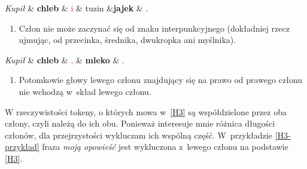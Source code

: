\begin{exe}
\ex  \label{H1-przykład}
\begin{dependency}[baseline=-\the\dimexpr\fontdimen22\textfont2\relax]
\begin{deptext}[column sep=1em, row sep=.1ex]
\emph{Kupił} \& \textbf{chleb} \& \textcolor{red}{i} \& tuzin \&\textbf{jajek} \& .  \\ 
\end{deptext}
\end{dependency}
\end{exe}

\begin{enumerate}
\item[\namedlabel{H2}{(H2)}]
Człon nie może zaczynać się od znaku interpunkcyjnego (dokładniej rzecz ujmując, od przecinka, średnika, dwukropka ani myślnika).
\end{enumerate}

\begin{exe}
\ex  \label{H2-przykład}
\begin{dependency}[baseline=-\the\dimexpr\fontdimen22\textfont2\relax]
\begin{deptext}[column sep=1em]
\emph{Kupił} \& \textbf{chleb} \& \textcolor{red}{,} \& \textbf{mleko} \& .  \\ 
\end{deptext}
\end{dependency}
\end{exe}

\begin{enumerate}
\item[\namedlabel{H3}{(H3)}]
Potomkowie głowy lewego członu znajdujący się na prawo od prawego członu nie wchodzą w~skład lewego członu.
\end{enumerate}

W rzeczywistości tokeny, o których mowa w~\ref{H3} są współdzielone przez oba człony, czyli należą do ich obu. Ponieważ interesuje mnie różnica długości członów, dla przejrzystości wykluczam ich wspólną część. W~przykładzie \eqref{H3-przykład} fraza \textit{moją opowieść} jest wykluczona z~lewego członu na podstawie \ref{H3}.

